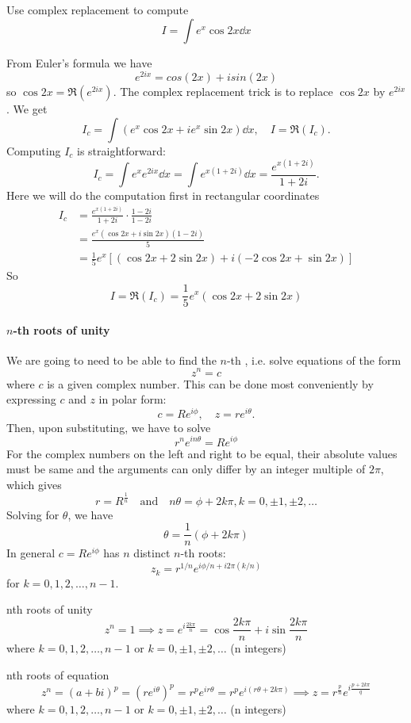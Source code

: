 \begin{exercise}{}{}
Use complex replacement to compute
\[ I = \int e^x \cos 2x \dd{x} \]
\end{exercise}
\begin{solution}
From Euler's formula we have
\[ e^{2ix} = cos(2x) + isin(2x) \]
so $\cos 2x = \Re(e^{2ix})$. The complex replacement trick is to replace $\cos 2x$ by $e^{2ix}$. We get
\[ I_c = \int (e^x \cos 2x + ie^x\sin 2x) \dd{x}, \quad I = \Re(I_c). \]
Computing $I_c$ is straightforward:
\[ I_c = \int e^xe^{2ix} \dd{x} = \int e^{x(1+2i)} \dd{x} = \frac{e^{x(1+2i)}}{1+2i}. \]
Here we will do the computation first in rectangular coordinates
\begin{align*}
I_c &= \frac{e^{x(1+2i)}}{1+2i} \cdot \frac{1-2i}{1-2i} \\
&= \frac{e^x(\cos 2x+i\sin 2x)(1-2i)}{5} \\
&= \frac{1}{5}e^x[(\cos2x+2\sin2x) + i(-2\cos2x+\sin2x)]
\end{align*}
So 
\[ I = \Re(I_c) = \boxed{\frac{1}{5}e^x(\cos2x+2\sin2x)} \]
\end{solution}

\paragraph{$n$-th roots of unity}
We are going to need to be able to find the $n$-th , i.e. solve equations of the form
\[ z^n=c \]
where $c$ is a given complex number. This can be done most conveniently by expressing $c$
and $z$ in polar form:
\[ c=Re^{i\phi}, \quad z=re^{i\theta}.\]
Then, upon substituting, we have to solve
\[ r^n e^{in\theta} = Re^{i\phi} \]
For the complex numbers on the left and right to be equal, their absolute values must be same and the arguments can only differ by an integer multiple of $2\pi$, which gives
\[ r=R^\frac{1}{n} \quad \text{and} \quad n\theta=\phi+2k\pi, k=0,\pm1,\pm2,\dots \]
Solving for $\theta$, we have
\begin{equation}
\theta = \frac{1}{n}(\phi+2k\pi)
\end{equation}
In general $c=Re^{i\phi}$ has $n$ distinct $n$-th roots:
\[ z_k = r^{1/n}e^{i\phi/n+i 2\pi(k/n)} \]
for $k=0,1,2,\dots,n-1$.


nth roots of unity
\[ z^n=1 \implies z=e^{i\frac{2k\pi}{n}}=\cos\frac{2k\pi}{n}+i\sin\frac{2k\pi}{n} \]
where $k=0,1,2,\dots,n-1$ or $k=0,\pm1,\pm2,\dots$ (n integers)

nth roots of equation
\[ z^n=(a+bi)^p=(re^{i\theta})^p=r^pe^{ir\theta}=r^pe^{i(r\theta+2k\pi)} \implies z=r^\frac{p}{n}e^{i\frac{p+2k\pi}{q}} \]
where $k=0,1,2,\dots,n-1$ or $k=0,\pm1,\pm2,\dots$ (n integers)

